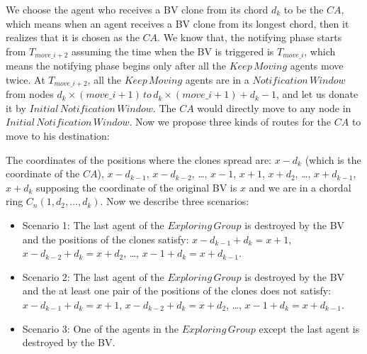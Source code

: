 
We choose the agent who receives a BV clone from its chord $d_k$ to be the $CA$, which means when an agent receives a BV clone from its longest chord, then it realizes that it is chosen as the $CA$. We know that, the notifying phase starts from $T_{move\_{i+2}}$ assuming the time when the BV is triggered is $T_{move\_i}$, which means the notifying phase begins only after all the $Keep\,Moving$ agents move twice. At $T_{move\_{i+2}}$, all the $Keep\,Moving$ agents are in a $Notification\,Window$ from nodes $d_k\times(move\_{i}+1)\,to\,d_k\times(move\_{i}+1) + d_{k}-1$, and let us donate it by $Initial\,Notification\,Window$. The $CA$ would directly move to any node in $Initial\,Notification\,Window$. Now we propose three kinds of routes for the $CA$ to move to his destination:

The coordinates of the positions where the clones spread are: $x-d_k$ (which is the coordinate of the $CA$), $x-d_{k-1}$, $x-d_{k-2}$, \ldots, $x-1$, $x+1$, $x+d_2$, \ldots, $x+d_{k-1}$, $x+d_{k}$ supposing the coordinate of the original BV is $x$ and we are in a chordal ring $C_n(1, d_2,\ldots, d_k)$.
 Now we describe three scenarios:
\begin{itemize}
\item Scenario 1: The last agent of the $Exploring\,Group$ is destroyed by the BV and the positions of the clones satisfy: $x-d_{k-1}+d_{k}=x+1$, $x-d_{k-2}+d_{k}=x+d_2$, \ldots, $x-1+d_{k}=x+d_{k-1}$. 
\item Scenario 2: The last agent of the $Exploring\,Group$ is destroyed by the BV and the at least one pair of the positions of the clones does not satisfy: $x-d_{k-1}+d_{k}=x+1$, $x-d_{k-2}+d_{k}=x+d_2$, \ldots, $x-1+d_{k}=x+d_{k-1}$. 
\item Scenario 3: One of the agents in the $Exploring\,Group$ except the last agent is destroyed by the BV.
\end{itemize}

